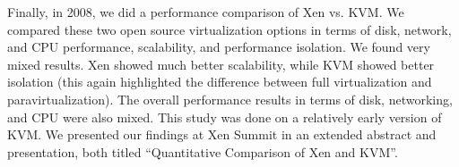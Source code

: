 Finally, in 2008, we did a performance comparison of Xen vs. KVM. We compared these two open source virtualization options in terms of disk, network, and CPU performance, scalability, and performance isolation. We found very mixed results. Xen showed much better scalability, while KVM showed better isolation (this again highlighted the difference between full virtualization and paravirtualization). The overall performance results in terms of disk, networking, and CPU were also mixed. This study was done on a relatively early version of KVM. We presented our findings at Xen Summit in an extended abstract and presentation, both titled ``Quantitative Comparison of Xen and KVM''\cite{kvm_vs_xen_at_xen_summit_2008}.


